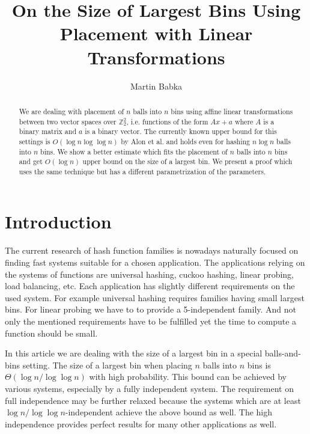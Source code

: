 \documentclass{article}
\title{On the Size of Largest Bins Using Placement with Linear Transformations}
\author{Martin Babka}
\newcommand{\vecspace}[2]{\mathbb{Z}_{#1}^{#2}}
\newcommand{\binvecspace}[1]{\vecspace{2}{#1}}
\begin{document}
\maketitle

\begin{abstract}
We are dealing with placement of $n$ balls into $n$ bins using affine linear transformations between two vector spaces over $\binvecspace{2}$, i.e. functions of the form $Ax + a$ where $A$ is a binary matrix and $a$ is a binary vector.
The currently known upper bound for this settings is $O(\log n \log \log n)$ by Alon et al. and holds even for hashing $n \log n$ balls into $n$ bins.
We show a better estimate which fits the placement of $n$ balls into $n$ bins and get $O(\log n)$ upper bound on the size of a largest bin.
We present a proof which uses the same technique but has a different parametrization of the parameters.
\end{abstract}

\section{Introduction}

The current research of hash function families is nowadays naturally focused on finding fast systems suitable for a chosen application.
The applications relying on the systems of functions are universal hashing, cuckoo hashing, linear probing, load balancing, etc.
Each application has slightly different requirements on the used system.
For example universal hashing requires families having small largest bins. 
For linear probing we have to to provide a 5-independent family.
And not only the mentioned requirements have to be fulfilled yet the time to compute a function should be small.

In this article we are dealing with the size of a largest bin in a special balls-and-bins setting.
The size of a largest bin when placing $n$ balls into $n$ bins is $\Theta(\log n/\log \log n)$ with high probability.
This bound can be achieved by various systems, especially by a fully independent system.
The requirement on full independence may be further relaxed because the systems which are at least $\log n/\log \log n$-independent achieve the above bound as well.
The high independence provides perfect results for many other applications as well.
\end{document}
